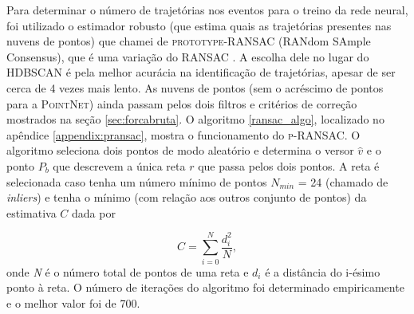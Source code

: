 \documentclass[a4paper,12pt,oneside]{book}
\begin{document}
\par Para determinar o número de trajetórias nos eventos para o treino da rede neural, foi utilizado o estimador robusto (que estima quais as trajetórias presentes nas nuvens de pontos) que chamei de \textsc{prototype-RANSAC} (RANdom SAmple Consensus), que é uma variação do \textsc{RANSAC} \cite{ransac, artigo}. A escolha dele no lugar do \textsc{HDBSCAN} é pela melhor acurácia na identificação de trajetórias, apesar de ser cerca de 4 vezes mais lento. As nuvens de pontos (sem o acréscimo de pontos para a \textsc{PointNet}) ainda passam pelos dois filtros e critérios de correção mostrados na seção \ref{sec:forcabruta}. O algoritmo \ref{ransac_algo}, localizado no apêndice \ref{appendix:pransac}, mostra o funcionamento do \textsc{p-RANSAC}. O algoritmo seleciona dois pontos de modo aleatório e determina o versor $\hat{v}$ e o ponto $P_b$ que descrevem a única reta $r$ que passa pelos dois pontos. A reta é selecionada caso tenha um número mínimo de pontos $N_{min}$ = 24 (chamado de \textit{inliers}) e tenha o mínimo (com relação aos outros conjunto de pontos) da estimativa $C$ dada por \cite{artigo}

\begin{equation} \label{criterio_ransac}
    C = \sum_{i = 0}^{N} \frac{d_i ^2}{N},
\end{equation}
%
onde \textit{N} é o número total de pontos de uma reta e $d_i$ é a distância do i-ésimo ponto à reta. O número de iterações do algoritmo foi determinado empiricamente e o melhor valor foi de 700.

\end{document}
